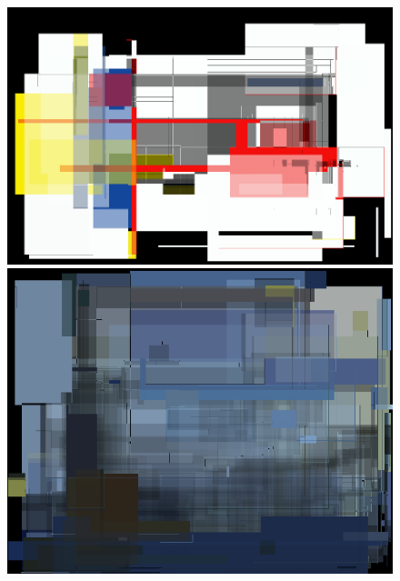 \documentclass[a4paper,twocolumn]{article}
\begin{document}
\begin{figure}[h!]
        \centering
        \begin{minipage}[t]{0.16\textwidth}
                \centering
                \includegraphics[width=\linewidth]{approx/piet_mondrian_composition.png}
        \end{minipage}
        \begin{minipage}[t]{0.14\textwidth}
                \centering
                \includegraphics[width=\linewidth]{approx/van_gogh_starry_night.png}
        \end{minipage}
        \begin{minipage}[t]{0.08\textwidth}
                \centering

\end{minipage}
\end{figure}
\end{document}
